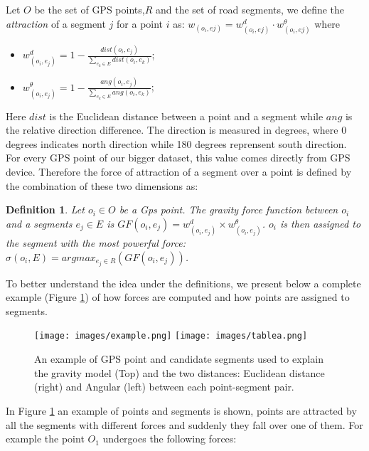 \documentclass[5p]{elsarticle}
\newtheorem{definition}{Definition}
\begin{document}
\label{gravitymodel}
Let $O$ be the set of GPS points,$R$  and the set of road segments,  we define the \emph{attraction} of a segment $j$ for a point $i$ as:
$w_{(o_{i},e{j})} = w^{d}_{(o_{i},e{j})} \cdot w^{\theta}_{(o_{i},e{j})}$ where 
\begin{itemize}
\item $w_{(o_{i},e_{j})}^{d} = 1 - \frac{dist(o_{i}, e_{j})}{\sum\limits_{e_{k} \in E} dist(o_{i}, e_{k})}$; 
\item $w_{(o_{i},e_{j})}^{\theta} = 1 - \frac{ang(o_{i}, e_{j})}{\sum\limits_{e_{k} \in E} ang(o_{i}, e_{k})}$;  
\end{itemize} 
Here $dist$ is the Euclidean distance between a point and a segment while $ang$ is the relative direction difference. The direction is measured in degrees,
where 0 degrees indicates north direction while 180 degrees reprensent south direction. For every GPS point of our bigger dataset, this value
comes directly from GPS device.
Therefore the force of attraction of a segment over a point is defined by the combination of these two dimensions as:
\begin{definition}
Let $o_{i} \in O$ be a Gps point. The gravity force function between $o_{i}$ and a segments $e_{j} \in E$ is  $GF(o_{i},e_{j}) = w_{(o_{i},e_{j})}^{d} \times w_{(o_{i},e_{j})}^{\theta}$.
$o_{i}$ is then assigned to the segment with the most powerful force: $\sigma(o_{i}, E) = argmax_{e_{j} \in R}(GF(o_{i},e_{j}))$.
\end{definition}





To better understand the idea under the definitions, we present below a complete example (Figure  \ref{fig:example}) of how forces are computed and how 
points are assigned to segments.
\begin{figure}[!t]
\begin{center}
\texttt{[image: images/example.png]}
\texttt{[image: images/tablea.png]}
\caption{An example of GPS point and candidate segments used to explain the gravity model (Top) and the two distances: Euclidean distance (right) and Angular (left) 
between each point-segment pair.}\label{fig:example}
\end{center}
\end{figure}
In Figure \ref{fig:example} an example of points and segments is shown, points are attracted by all the segments with different forces and suddenly they fall over one of them.
For example the point $O_{1}$ undergoes the following forces: 
\end{document}
